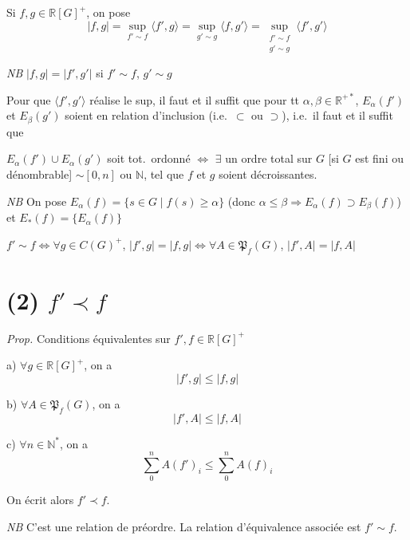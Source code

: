 \documentclass[11pt,a4paper]{article}
\begin{document}
Si $f,g\in\mathbb{R}[G]^+$, on pose
\[
  |f,g|=\sup_{f'\sim f}\langle f',g\rangle=\sup_{g'\sim g}\langle f,g'\rangle=\sup_{\substack{f'\sim f\\ g'\sim g}}\langle f',g'\rangle
\]

\emph{NB} $|f,g|=|f',g'|$ si $f'\sim f$, $g'\sim g$

 Pour que $\langle f',g'\rangle$ réalise le sup, il faut et il suffit que pour tt $\alpha,\beta\in\mathbb{R}^{+*}$, $E_\alpha(f')$ et $E_\beta(g')$ soient en relation d'inclusion (i.e.\ $\subset$ ou $\supset$), i.e.\ il faut et il suffit que

$E_\alpha(f')\cup E_\alpha(g')$ soit tot.\ ordonné $\Longleftrightarrow$ $\exists$ un ordre total sur $G$ [si $G$ est fini ou dénombrable] $\sim[0,n]$ ou $\mathbb{N}$, tel que $f$ et $g$ soient décroissantes.

\emph{NB} On pose $E_\alpha(f)=\{s\in G\mid f(s)\geqslant\alpha\}$ (donc $\alpha\leqslant\beta\Rightarrow E_\alpha(f)\supset E_\beta(f)$) et $E_*(f)=\{E_\alpha(f)\}$

 $f'\sim f\Longleftrightarrow\forall g\in C(G)^+$, $|f',g|=|f,g|\Longleftrightarrow\forall A\in\mathfrak{P}_f(G)$, $|f',A|=|f,A|$

\section*{(2) $f'\prec f$}

\emph{Prop.} Conditions équivalentes sur $f',f\in\mathbb{R}[G]^+$

a) $\forall g\in\mathbb{R}[G]^+$, on a
\[
  |f',g|\leqslant|f,g|
\]

b) $\forall A\in\mathfrak{P}_f(G)$, on a
\[
  |f',A|\leqslant|f,A|
\]

c) \struck{\ill{}} $\forall n\in\mathbb{N}^*$, on a
\[
  \sum_0^n A(f')_i\leqslant\sum_0^n A(f)_i
\]

On écrit alors $f'\prec f$.

\emph{NB} C'est une relation  de préordre. La relation d'équivalence associée est $f'\sim f$.
\end{document}
